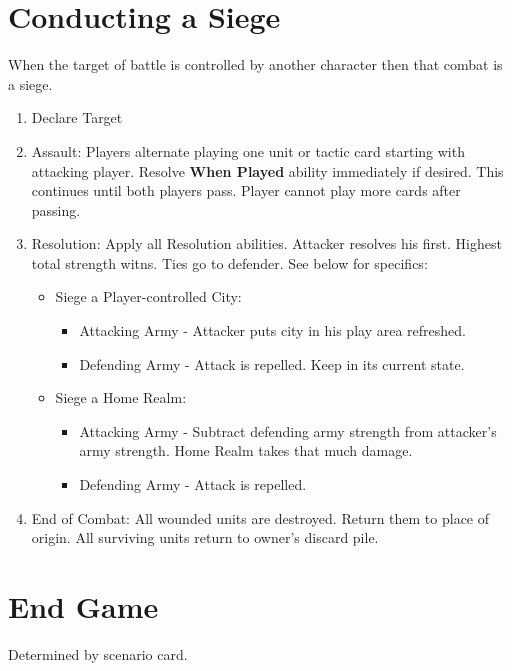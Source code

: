 \documentclass[12pt]{article}
\newenvironment{enumerateCustom}
{\begin{enumerate}
  \setlength{\itemsep}{1pt}
  \setlength{\parskip}{0pt}
  \setlength{\parsep}{0pt}}
{\end{enumerate}}
\newenvironment{itemizeCustom}
{\begin{itemize}
  \setlength{\itemsep}{1pt}
  \setlength{\parskip}{0pt}
  \setlength{\parsep}{0pt}}
{\end{itemize}}
\begin{document}
\begin{multicols*}{2}
\section*{Conducting a Siege}
When the target of battle is controlled by another character then that combat is a siege.
\begin{enumerateCustom}
    \item Declare Target
    \item Assault: Players alternate playing one unit or tactic card starting with attacking player. Resolve \textbf{When Played} ability immediately if desired. This continues until both players pass. Player cannot play more cards after passing.
    \item Resolution: Apply all Resolution abilities. Attacker resolves his first. Highest total strength witns. Ties go to defender. See below for specifics:
        \begin{itemizeCustom}
            \item Siege a Player-controlled City:
                \begin{itemizeCustom}
                    \item Attacking Army - Attacker puts city in his play area refreshed.
                    \item Defending Army - Attack is repelled. Keep in its current state.
                \end{itemizeCustom}
            \item Siege a Home Realm:
                \begin{itemizeCustom}
                    \item Attacking Army - Subtract defending army strength from attacker's army strength. Home Realm takes that much damage.
                    \item Defending Army - Attack is repelled.
                \end{itemizeCustom}
        \end{itemizeCustom}
    \item End of Combat: All wounded units are destroyed. Return them to place of origin. All surviving units return to owner's discard pile.
\end{enumerateCustom}

\section*{End Game}
Determined by scenario card.

\end{multicols*}
\end{document}
